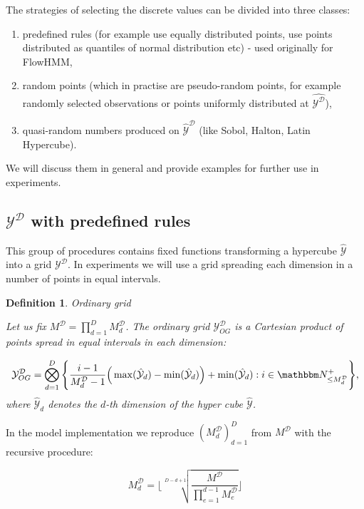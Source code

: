 \documentclass[shortabstract]{iithesis}
\newtheorem{definition}{Definition}
\begin{document}
The strategies of selecting the discrete values can be divided into three classes:
\begin{enumerate}
    \item predefined rules (for example use equally distributed points, use points distributed as quantiles of normal distribution etc) - used originally for FlowHMM,
    \item random points (which in practise are pseudo-random points, for example randomly selected observations or points uniformly distributed at $\hat{\mathcal{Y}^{\mathcal{D}}}$),
    \item quasi-random numbers produced on $\hat{\mathcal{Y}}^{\mathcal{D}}$ (like Sobol, Halton, Latin Hypercube).
\end{enumerate}
We will discuss them in general and provide examples for further use in experiments. 

\subsection{$\mathcal{Y}^{\mathcal{D}}$ with predefined rules} \label{sec:ordinar_grid}

This group of procedures contains fixed functions transforming a hypercube $\hat{\mathcal{Y}}$ into a grid $\mathcal{Y}^{\mathcal{D}}$. In experiments we will use a grid spreading each dimension in a number of points in equal intervals. 

\begin{definition}{Ordinary grid} 

    Let us fix $M^{\mathcal  D} = \prod_{d=1}^D M_d^{\mathcal  D}$. The ordinary grid $\mathcal Y^{\mathcal D}_{OG}$ is a Cartesian product of points spread in equal intervals in each dimension:
    
    \begin{equation*}
        \mathcal Y^{\mathcal D}_{OG} = \bigotimes_{d=1}^D \Bigg\{\frac{i-1}{M_d^{\mathcal D}-1}\Big(\max(\hat{\mathcal{Y}}_d) - \min(\hat{\mathcal{Y}}_d) \Big) + \min(\hat{\mathcal{Y}}_d): i \in \mathbbm N_{\leq M_d^{\mathcal D}}^+ \Bigg\}\text{,}
    \end{equation*}
    where $\hat{\mathcal{Y}}_d$ denotes the $d$-th dimension of the hyper cube $\hat{\mathcal{Y}}$.
\end{definition}


In the model implementation we reproduce $(M_d^{\mathcal  D})_{d=1}^{D}$ from $M^{\mathcal  D}$ with the recursive procedure:

\begin{equation*}
    M_d^{\mathcal  D} =\Bigg\lfloor \sqrt[D - d + 1]{\frac{M^{\mathcal  D}}{\prod_{e=1}^{d-1} M_e^{\mathcal  D}}} \Bigg\rfloor
\end{equation*}
\end{document}
